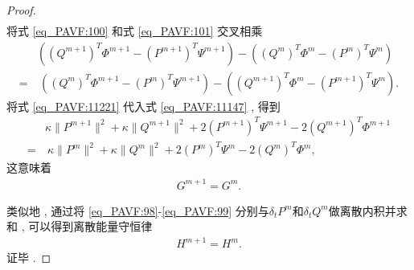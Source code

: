 \begin{proof}
\begin{align}
\end{align}
将式 \eqref{eq_PAVF:100} 和式 \eqref{eq_PAVF:101} 交叉相乘
\begin{align}\label{eq_PAVF:11221}
&((Q^{m+1})^{T}\varPhi^{m+1}-(P^{m+1})^{T}\Psi^{m+1})-((Q^{m})^{T}\varPhi^{m}-(P^{m})^{T}\Psi^{m})\nonumber\\
=&~((Q^{m})^{T}\varPhi^{m+1}-(P^{m})^{T}\Psi^{m+1})-((Q^{m+1})^{T}\varPhi^{m}-(P^{m+1})^{T}\Psi^{m}) . 
\end{align}
将式 \eqref{eq_PAVF:11221} 代入式 \eqref{eq_PAVF:11147} , 得到
\begin{align}
&\kappa \|P^{m+1}\|^2+\kappa \|Q^{m+1}\|^2+2(P^{m+1})^{T}\Psi^{m+1}-2(Q^{m+1})^{T}\varPhi^{m+1}\nonumber
\\=&~\kappa \|P^{m}\|^2+\kappa \|Q^{m}\|^2+2(P^{m})^{T}\Psi^{m}-2(Q^{m})^{T}\varPhi^{m} , \label{eq_PAVF:11155}
\end{align}
这意味着
\begin{align}\label{eq_PAVF:11149}
G^{m+1}=G^{m}  . 
\end{align}

类似地 , 通过将 \eqref{eq_PAVF:98}-\eqref{eq_PAVF:99} 分别与$\delta_t P^{m}$和$\delta_t Q^{m}$做离散内积并求和 , 可以得到离散能量守恒律
\begin{align}\label{eq_PAVF:11156}
H^{m+1}=H^{m} . 
\end{align}
证毕 . 
\end{proof}

